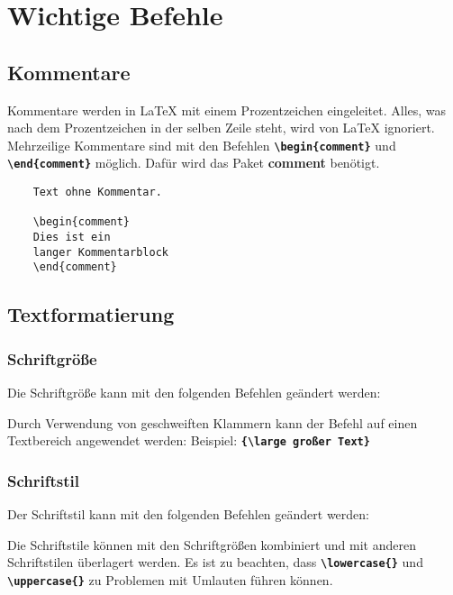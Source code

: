 \section{Wichtige Befehle}
\subsection{Kommentare}
Kommentare werden in \LaTeX{} mit einem Prozentzeichen eingeleitet. Alles, was nach dem Prozentzeichen in der selben Zeile steht, wird von \LaTeX{} ignoriert. Mehrzeilige Kommentare sind mit den Befehlen \textbf{\texttt{\textbackslash begin\{comment\}}} und \textbf{\texttt{\textbackslash end\{comment\}}} möglich. Dafür wird das Paket \textbf{comment} benötigt.

\begin{lstlisting}[language={[LaTeX]TeX}]
    % Dies ist ein einzeiliger Kommentar
    Text ohne Kommentar.
    
    \begin{comment}
    Dies ist ein
    langer Kommentarblock
    \end{comment}
\end{lstlisting}

\subsection{Textformatierung}
\subsubsection{Schriftgröße}
Die Schriftgröße kann mit den folgenden Befehlen geändert werden:



Durch Verwendung von geschweiften Klammern kann der Befehl auf einen Textbereich angewendet werden:
Beispiel: \textbf{\texttt{\{\textbackslash large großer Text\}}}

\subsubsection{Schriftstil}
Der Schriftstil kann mit den folgenden Befehlen geändert werden:



Die Schriftstile können mit den Schriftgrößen kombiniert und mit anderen Schriftstilen überlagert werden.
Es ist zu beachten, dass \textbf{\texttt{\textbackslash lowercase\{\}}} und \textbf{\texttt{\textbackslash uppercase\{\}}} zu Problemen mit Umlauten führen können.


